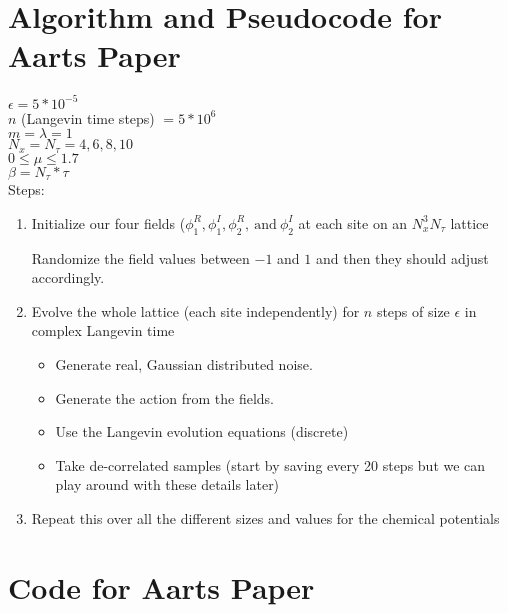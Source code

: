 \documentclass[../../RotatingBosons.tex]{subfiles}
\begin{document}
\section{\label{AartsPseudocode}Algorithm and Pseudocode for Aarts Paper}
$\epsilon = 5*10^{-5}$\\
$n$ (Langevin time steps) $= 5*10^{6}$\\
$m = \lambda = 1$\\
$N_x = N_{\tau} = 4,6,8,10$\\
$0 \leq \mu \leq 1.7$\\
$\beta = N_{\tau}*\tau$\\
Steps:
\begin{enumerate}
	\item Initialize our four fields ($\phi_{1}^{R}, \phi_{1}^{I},\phi_{2}^{R},\ \text{and}\ \phi_{2}^{I}$ at each site on an $N_{x}^{3}N_{\tau}$ lattice
	
    Randomize the field values between $-1$ and $1$ and then they should adjust accordingly.
	
	\item Evolve the whole lattice (each site independently) for $n$ steps of size $\epsilon$ in complex Langevin time
	
	\begin{itemize}
	    \item Generate real, Gaussian distributed noise. 
	    
	    \item Generate the action from the fields.
	    
	    \item Use the Langevin evolution equations (discrete)
	    
	    \item Take de-correlated samples (start by saving every 20 steps but we can play around with these details later)
	    
	\end{itemize}
	
	\item Repeat this over all the different sizes and values for the chemical potentials
\end{enumerate}

\section{\label{AartsCode}Code for Aarts Paper}
\end{document}
